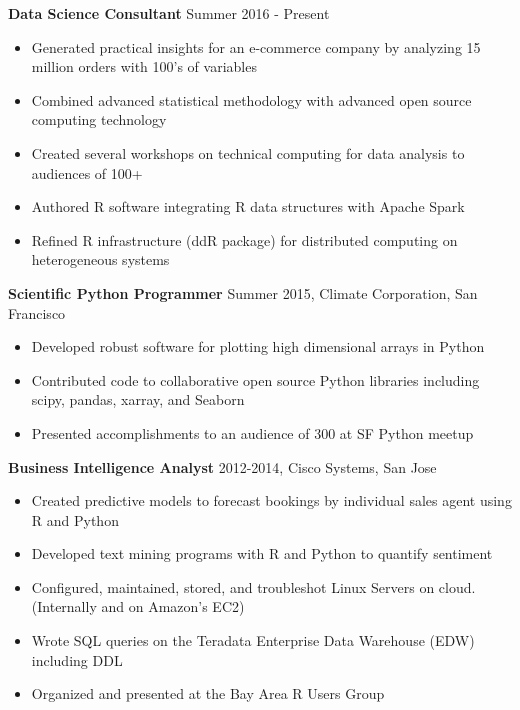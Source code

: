 \documentclass{article}
\begin{document}
\begin{description}

\item  \textbf{Data Science Consultant} 
    \hspace{.5cm} 
    Summer 2016 - Present
  
\begin{itemize}
\item Generated practical insights for an e-commerce company by
    analyzing 15 million orders with 100's of variables
\item Combined advanced statistical methodology with advanced open source
    computing technology
\item Created several workshops on technical computing
    for data analysis to audiences of 100+
\item Authored R software integrating R data structures with Apache Spark
\item Refined R infrastructure (ddR package) for distributed computing on
    heterogeneous systems
\end{itemize}

\item  \textbf{Scientific Python Programmer} 
    \hspace{.5cm} 
    Summer 2015, Climate Corporation, San Francisco
  
\begin{itemize}
\item Developed robust software for plotting high dimensional arrays in
    Python
\item Contributed code to collaborative open source Python libraries including
    scipy, pandas, xarray, and Seaborn
\item Presented accomplishments to an audience of 300 at SF Python meetup
\end{itemize}

\item  \textbf{Business Intelligence Analyst} 
    \hspace{.5cm} 
    2012-2014, Cisco Systems, San Jose
  
\begin{itemize}
\item Created predictive models to forecast bookings by individual sales agent using R and Python
\item Developed text mining programs with R and Python to quantify sentiment
\item Configured, maintained, stored, and troubleshot Linux Servers on cloud. (Internally and on Amazon's EC2)
\item Wrote SQL queries on the Teradata Enterprise Data Warehouse (EDW) including DDL
\item Organized and presented at the Bay Area R Users Group
\end{itemize}

\end{description}
\end{document}
